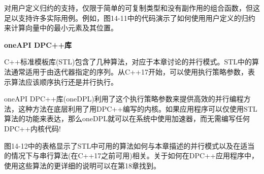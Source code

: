 对用户定义归约的支持，仅限于简单的可复制类型和没有副作用的组合函数，但这足以支持许多实际用例。例如，图14-11中的代码演示了如何使用用户定义的归约来计算向量中的最小元素及其位置。\par

\hspace*{\fill} \par %
\textbf{oneAPI DPC++库}

C++标准模板库(STL)包含了几种算法，对应于本章讨论的并行模式。STL中的算法通常适用于由迭代器指定的序列。从C++17开始，可以使用执行策略参数，表示算法应该顺序执行还是并行执行。\par

oneAPI DPC++库(oneDPL)利用了这个执行策略参数来提供高效的并行编程方法，这种方法在底层利用了用DPC++编写的内核。如果应用程序可以仅使用STL算法的功能来表达，那么oneDPL就可以在系统中使用加速器，而无需编写任何DPC++内核代码!\par

图14-12中的表格显示了STL中可用的算法如何与本章描述的并行模式以及在适当的情况下与串行算法(在C++17之前可用)相关。关于如何在DPC++应用程序中，使用这些算法的更详细的说明可以在第18章找到。\par

